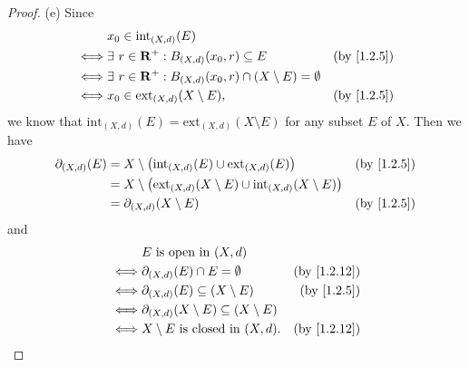 \begin{proof}{(e)}
  Since
  \begin{align*}
         & x_0 \in \text{int}_{(X, d)}(E)                                                                       \\
    \iff & \exists\ r \in \R^+ : B_{(X, d)}(x_0, r) \subseteq E                      & \text{(by \cref{1.2.5})} \\
    \iff & \exists\ r \in \R^+ : B_{(X, d)}(x_0, r) \cap (X \setminus E) = \emptyset                            \\
    \iff & x_0 \in \text{ext}_{(X, d)}(X \setminus E),                               & \text{(by \cref{1.2.5})}
  \end{align*}
  we know that \(\text{int}_{(X, d)}(E) = \text{ext}_{(X, d)}(X \setminus E)\) for any subset \(E\) of \(X\).
  Then we have
  \begin{align*}
    \partial_{(X, d)}(E) & = X \setminus \big(\text{int}_{(X, d)}(E) \cup \text{ext}_{(X, d)}(E)\big)                         & \text{(by \cref{1.2.5})} \\
                         & = X \setminus \big(\text{ext}_{(X, d)}(X \setminus E) \cup \text{int}_{(X, d)}(X \setminus E)\big)                            \\
                         & = \partial_{(X, d)}(X \setminus E)                                                                 & \text{(by \cref{1.2.5})}
  \end{align*}
  and
  \begin{align*}
         & E \text{ is open in } (X, d)                                                           \\
    \iff & \partial_{(X, d)}(E) \cap E = \emptyset                    & \text{(by \cref{1.2.12})} \\
    \iff & \partial_{(X, d)}(E) \subseteq (X \setminus E)             & \text{(by \cref{1.2.5})}  \\
    \iff & \partial_{(X, d)}(X \setminus E) \subseteq (X \setminus E)                             \\
    \iff & X \setminus E \text{ is closed in } (X, d).                & \text{(by \cref{1.2.12})}
  \end{align*}
\end{proof}

